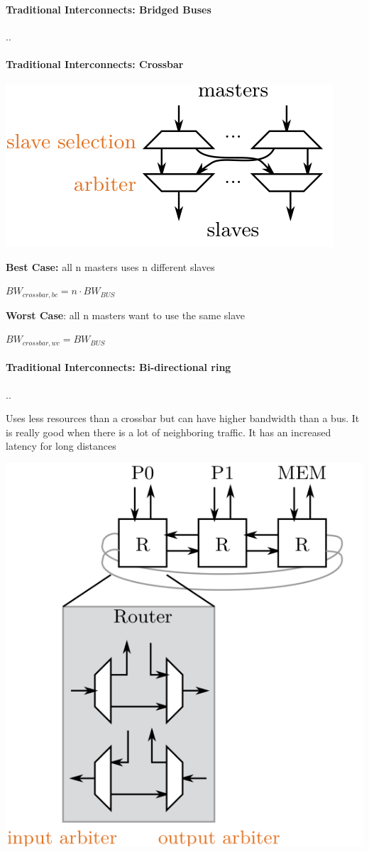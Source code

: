 \documentclass[fontsize=8pt]{scrartcl}
\newcommand{\coloreq}[1]{\colorbox{nordicRed}{\(\displaystyle #1\)}}
\begin{document}
\begin{multicols*}{4}
\paragraph{Traditional Interconnects: Bridged Buses} ..

\paragraph{Traditional Interconnects: Crossbar} 

\begin{center}
  \centering
  \includegraphics[width=0.4\linewidth]{img/crossbar.png}
  \label{fig:crossbar}
\end{center}

\textbf{Best Case:} all n masters uses n different slaves

\coloreq{BW_{crossbar,bc} = n \cdot BW_{BUS}}

\textbf{Worst Case}: all n masters want to use the same slave

\coloreq{BW_{crossbar,wc} = BW_{BUS}}


\paragraph{Traditional Interconnects: Bi-directional ring} ..

\begin{multicols*}{2}
  Uses less resources than a crossbar but can have higher bandwidth than a bus. It is really good when there is a lot of neighboring traffic. It has an increased latency for long distances
\begin{center}
  \centering
  \includegraphics[width=0.8\linewidth]{img/bi-directional ring.png}
  \label{fig:bi-directional-ring}
\end{center}
\end{multicols*}


\end{multicols*}
\end{document}
